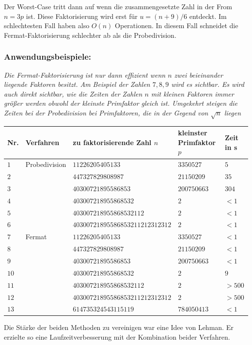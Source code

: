 \documentclass[a4paper,11pt]{article}
\begin{document}
Der Worst-Case tritt dann auf wenn die zusammengesetzte Zahl in der From
$n = 3p$ ist. Diese Faktorisierung wird erst für $u = (n+9)/6$ entdeckt.
Im schlechtesten Fall haben also $O(n)$ Operationen. In diesem Fall schneidet
die Fermat-Faktorisierung schlechter ab als die Probedivision.

\subsubsection*{Anwendungsbeispiele:}
{\it
Die Fermat-Faktorisierung ist nur dann effizient wenn $n$ zwei beieinander liegende
Faktoren besitzt. Am Beispiel der Zahlen $7,8,9$ wird es sichtbar. Es wird
auch direkt sichtbar, wie die Zeiten der Zahlen $n$ mit kleinen Faktoren
immer größer werden obwohl der kleinste Primfaktor gleich ist. Umgekehrt
steigen die Zeiten bei der Probedivision bei Primfaktoren,
die in der Gegend von $\sqrt{n}$ liegen }
\begin{center}
\begin{tabular}{|l|l|l|l|l|}
\hline
Nr. & Verfahren & zu faktorisierende Zahl $n$ & kleinster Primfaktor $p$ & Zeit in s\\
\hline
$1$& Probedivision & $11226205405133$ & $3350527$ & $5$\\
$2$&	& $447327829808987$ & $21150209$ & $35$\\
$3$&	& $40300721895586853$  & $200750663$ & $304$\\
$4$&	& $403007218955868532$ & $2$ & $<1$\\
$5$&	& $403007218955868532112$ & $2$ & $<1$\\
$6$&	& $40300721895586853211212312312$ & $2$ & $<1$\\
\hline
$7$& Fermat & $11226205405133$ & $3350527$ & $<1$\\
$8$&	& $447327829808987$ & $21150209$ & $<1$\\
$9$&	& $40300721895586853$  & $200750663$ & $<1$\\
$10$&	& $403007218955868532$ & $2$ & $9$\\
$11$&	& $403007218955868532112$ & $2$ & $>500$\\
$12$&	& $40300721895586853211212312312$ & $2$ & $>500$\\
$13$&	& $614735324543115119$ & $784050413$ & $<1$\\
\hline
\end{tabular}
\end{center}
Die Stärke der beiden Methoden zu vereinigen war eine Idee von Lehman. Er erzielte
so eine Laufzeitverbesserung mit der Kombination beider Verfahren.
\end{document}
